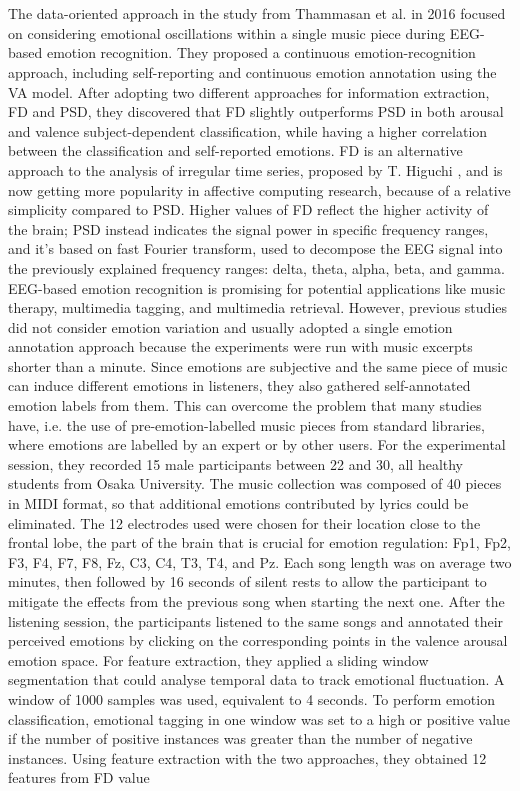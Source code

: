\\
\\
The data-oriented approach in the study from Thammasan et al.  \cite{thammasan_continuous_2016}  in 2016 focused on considering emotional oscillations within a single music piece during EEG-based emotion recognition. They proposed a continuous emotion-recognition approach, including self-reporting and continuous emotion annotation using the VA model. After adopting two different approaches for information extraction, \ac{FD} and \ac{PSD}, they discovered that \ac{FD} slightly outperforms \ac{PSD} in both arousal and valence subject-dependent classification, while having a higher correlation between the classification and self-reported emotions. \ac{FD} is an alternative approach to the analysis of irregular time series, proposed by T. Higuchi \cite{higuchi_approach_1988}, and is now getting more popularity in affective computing research, because of a relative simplicity compared to \ac{PSD}. Higher values of FD reflect the higher activity of the brain; \ac{PSD} instead indicates the signal power in specific frequency ranges, and it’s based on fast Fourier transform, used to decompose the EEG signal into the previously explained frequency ranges: delta, theta, alpha, beta, and gamma. EEG-based emotion recognition is promising for potential applications like music therapy, multimedia tagging, and multimedia retrieval. However, previous studies did not consider emotion variation and usually adopted a single emotion annotation approach because the experiments were run with music excerpts shorter than a minute. Since emotions are subjective and the same piece of music can induce different emotions in listeners, they also gathered self-annotated emotion labels from them. This can overcome the problem that many studies have, i.e. the use of pre-emotion-labelled music pieces from standard libraries, where emotions are labelled by an expert or by other users. For the experimental session, they recorded 15 male participants between 22 and 30, all healthy students from Osaka University. The music collection was composed of 40 pieces in MIDI format, so that additional emotions contributed by lyrics could be eliminated. The 12 electrodes used were chosen for their location close to the frontal lobe, the part of the brain that is crucial for emotion regulation: Fp1, Fp2, F3, F4, F7, F8, Fz, C3, C4, T3, T4, and Pz. Each song length was on average two minutes, then followed by 16 seconds of silent rests to allow the participant to mitigate the effects from the previous song when starting the next one. After the listening session, the participants listened to the same songs and annotated their perceived emotions by clicking on the corresponding points in the valence arousal emotion space. For feature extraction, they applied a sliding window segmentation that could analyse temporal data to track emotional fluctuation. A window of 1000 samples was used, equivalent to 4 seconds. To perform emotion classification, emotional tagging in one window was set to a high or positive value if the number of positive instances was greater than the number of negative instances. Using feature extraction with the two approaches, they obtained 12 features from \ac{FD} value 